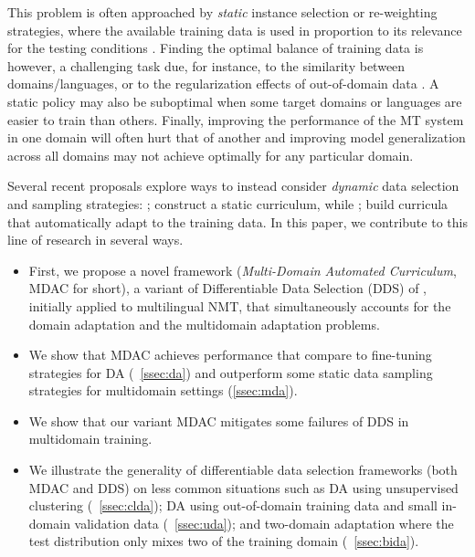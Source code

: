 \documentclass[11pt]{article}
\begin{document}
This problem is often approached by \emph{static} instance selection or re-weighting strategies, where the available training data is used in proportion to its relevance for the testing conditions \cite{Moore10selection,Axelrod11domain}. Finding the optimal balance of training data is however, a challenging task due, for instance, to the similarity between domains/languages, or to the regularization effects of out-of-domain data \cite{Miceli-barone17regularization}. A static policy may also be suboptimal when some target domains or languages are easier to train than others. Finally, improving the performance of the MT system in one domain will often hurt that of another \cite{Vanderwees17dynamic,Britz17mixing} and improving model generalization across all domains \cite{koehn18findings} may not achieve optimally for any particular domain. 

Several recent proposals
explore ways to instead consider \emph{dynamic} data selection and sampling strategies: ;  construct a static curriculum, while ;  build curricula that automatically adapt to the training data. In this paper, we contribute to this line of research in several ways. 
\begin{itemize}
	\item First, we propose a novel framework (\emph{Multi-Domain Automated Curriculum}, MDAC for short), a variant of Differentiable Data Selection (DDS) of , initially applied to multilingual NMT, that simultaneously accounts for the domain adaptation and the multidomain adaptation problems.
	\item We show that MDAC achieves performance that compare to fine-tuning strategies for DA (\textsection~\ref{ssec:da}) and outperform some static data sampling strategies for multidomain settings (\ref{ssec:mda}).
	\item We show that our variant MDAC mitigates some failures of DDS in multidomain training.
	\item We illustrate the generality of differentiable data selection frameworks (both MDAC and DDS) on less common situations such as DA using unsupervised clustering (\textsection~\ref{ssec:clda}); DA using out-of-domain training data and small in-domain validation data (\textsection~\ref{ssec:uda}); and two-domain adaptation where the test distribution only mixes two of the training domain (\textsection~\ref{ssec:bida}).
\end{itemize}
\end{document}
